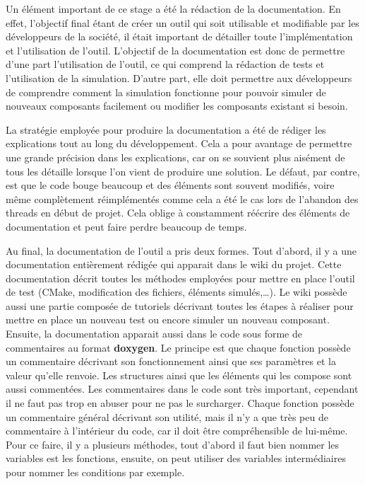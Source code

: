 \documentclass[a4paper]{article}
\begin{document}
Un élément important de ce stage a été la rédaction de la documentation. En
effet, l'objectif final étant de créer un outil qui soit utilisable et
modifiable par les développeurs de la société, il était important de détailler
toute l'implémentation et l'utilisation de l'outil. L'objectif de la
documentation est donc de permettre d'une part l'utilisation de l'outil, ce qui
comprend la rédaction de tests et l'utilisation de la simulation. D'autre part,
elle doit permettre aux développeurs de comprendre comment la simulation
fonctionne pour pouvoir simuler de nouveaux composants facilement ou modifier
les composants existant si besoin.

La stratégie employée pour produire la documentation a été de rédiger les
explications tout au long du développement. Cela a pour avantage de permettre
une grande précision dans les explications, car on se souvient plus aisément de
tous les détaille lorsque l'on vient de produire une solution. Le défaut, par
contre, est que le code bouge beaucoup et des éléments sont souvent modifiés, voire
même complètement réimplémentés comme cela a été le cas lors de l'abandon des
threads en début de projet. Cela oblige à constamment réécrire des éléments de
documentation et peut faire perdre beaucoup de temps.

Au final, la documentation de l'outil a pris deux formes. Tout d'abord, il y a
une documentation entièrement rédigée qui apparait dans le wiki du projet.
Cette documentation décrit toutes les méthodes employées pour mettre en place
l'outil de test (CMake, modification des fichiers, éléments simulés,\dots). Le
wiki possède aussi une partie composée de tutoriels décrivant toutes les étapes
à réaliser pour mettre en place un nouveau test ou encore simuler un nouveau
composant. Ensuite, la documentation apparait aussi dans le code sous forme de
commentaires au format \textbf{doxygen}. Le principe est que chaque fonction
possède un commentaire décrivant son fonctionnement ainsi que ses paramètres et
la valeur qu'elle renvoie. Les structures ainsi que les éléments qui les compose
sont aussi commentées. Les commentaires dans le code sont très important,
cependant il ne faut pas trop en abuser pour ne pas le surcharger. Chaque
fonction possède un commentaire général décrivant son utilité, mais il n'y a que
très peu de commentaire à l'intérieur du code, car il doit être compréhensible de
lui-même. Pour ce faire, il y a plusieurs méthodes, tout d'abord il faut bien
nommer les variables est les fonctions, ensuite, on peut utiliser des variables
intermédiaires pour nommer les conditions par exemple.
\end{document}
